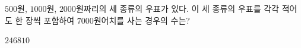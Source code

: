 $500$원, $1000$원, $2000$원짜리의 세 종류의 우표가 있다. 이 세 종류의 우표를 각각 적어도 한 장씩 포함하여 $7000$원어치를 사는 경우의 수는?
\begin{choices32}{$2$}{$4$}{$6$}{$8$}{$10$}\end{choices32}
